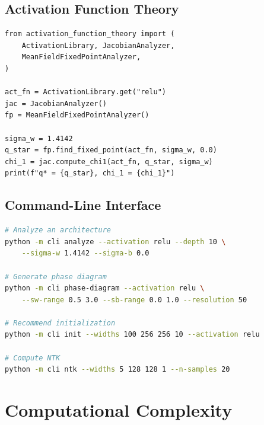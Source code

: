 \documentclass[10pt]{article}
\theoremstyle{definition}
\begin{document}
\subsection{Activation Function Theory}

\begin{lstlisting}
from activation_function_theory import (
    ActivationLibrary, JacobianAnalyzer,
    MeanFieldFixedPointAnalyzer,
)

act_fn = ActivationLibrary.get("relu")
jac = JacobianAnalyzer()
fp = MeanFieldFixedPointAnalyzer()

sigma_w = 1.4142
q_star = fp.find_fixed_point(act_fn, sigma_w, 0.0)
chi_1 = jac.compute_chi1(act_fn, q_star, sigma_w)
print(f"q* = {q_star}, chi_1 = {chi_1}")
\end{lstlisting}

\subsection{Command-Line Interface}

\begin{lstlisting}[language=bash]
# Analyze an architecture
python -m cli analyze --activation relu --depth 10 \
    --sigma-w 1.4142 --sigma-b 0.0

# Generate phase diagram
python -m cli phase-diagram --activation relu \
    --sw-range 0.5 3.0 --sb-range 0.0 1.0 --resolution 50

# Recommend initialization
python -m cli init --widths 100 256 256 10 --activation relu

# Compute NTK
python -m cli ntk --widths 5 128 128 1 --n-samples 20
\end{lstlisting}

\section{Computational Complexity}
\label{app:complexity}
\end{document}
